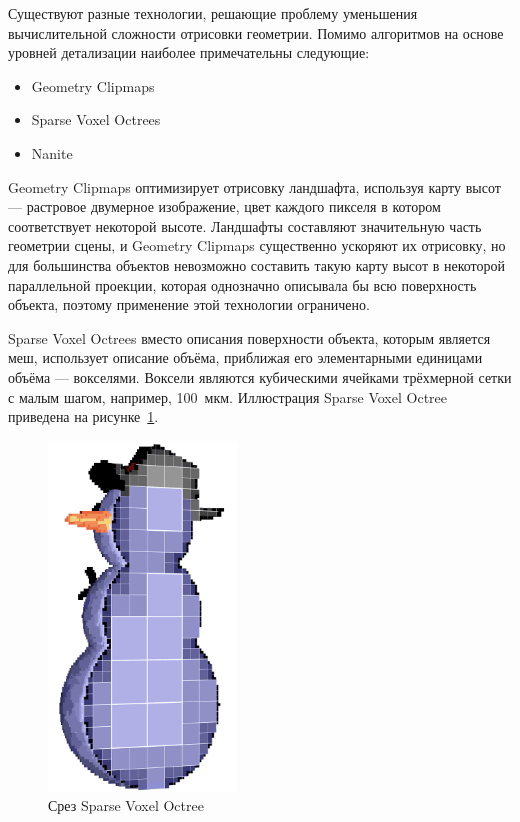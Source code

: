Существуют разные технологии, решающие проблему уменьшения вычислительной сложности отрисовки геометрии.
Помимо алгоритмов на основе уровней детализации наиболее примечательны следующие:
\begin{itemize}
    \item Geometry Clipmaps~\cite{GPUGems2GeometryClipmaps}
    \item Sparse Voxel Octrees~\cite{SparseVoxelOctrees}
    \item Nanite~\cite{NaniteManual}
\end{itemize}

Geometry Clipmaps оптимизирует отрисовку ландшафта, используя карту высот --- растровое двумерное изображение, цвет каждого пикселя в котором соответствует некоторой высоте.
Ландшафты составляют значительную часть геометрии сцены, и Geometry Clipmaps существенно ускоряют их отрисовку, но для большинства объектов невозможно составить такую карту высот в некоторой параллельной проекции, которая однозначно описывала бы всю поверхность объекта, поэтому применение этой технологии ограничено.

Sparse Voxel Octrees вместо описания поверхности объекта, которым является меш, использует описание объёма, приближая его элементарными единицами объёма --- вокселями.
Воксели являются кубическими ячейками трёхмерной сетки с малым шагом, например, 100~мкм.
Иллюстрация Sparse Voxel Octree~\cite{WikipediaSparseVoxelOctreeExample} приведена на рисунке~\ref{fig:SVO-voxel-snowman-slice-01}.

\begin{figure}[H]
    \centering
    \includegraphics[width=5cm]{pics/SVO-voxel-snowman-slice-01.png}
    \caption{Срез Sparse Voxel Octree}
    \label{fig:SVO-voxel-snowman-slice-01}
\end{figure}

